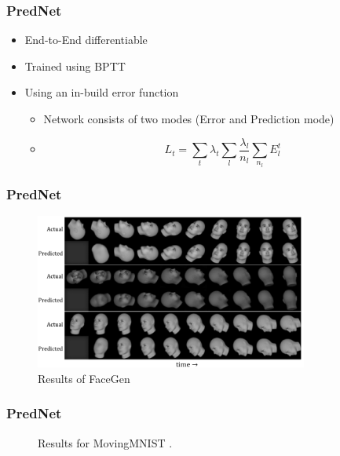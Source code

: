   \begin{frame}
   \frametitle{PredNet}
   
   \begin{itemize}
    \item<1-> End-to-End differentiable
    \item<2-> Trained using BPTT
    \item<3-> Using an in-build error function
    \begin{itemize}
     \item<4-> Network consists of two modes (Error and Prediction mode)
     \item<5->{
      \begin{equation}
       L_t = \sum_{t}\lambda_t \sum_l \frac{\lambda_l}{n_l} \sum_{n_l}E_l^t
      \end{equation}     
     }
    \end{itemize}
   \end{itemize}
  \end{frame}
  \begin{frame}
   \frametitle{PredNet}
   
   \begin{figure}[H]
    \includegraphics[width=0.8\textwidth]{../Images/prednet.png}
    \centering
    \caption{Results of FaceGen \citep{Lotter2016}}
    \label{fig:facegen_lotter}
   \end{figure}
   
  \end{frame}
  \begin{frame}
   \frametitle{PredNet}
   
   \begin{figure}[H]
   \centering
   \qquad
   \caption{Results for MovingMNIST \cite{Elsayed2018}.}
   \label{figure::elsayed_mnist}
  \end{figure}
  
  \end{frame}
  
